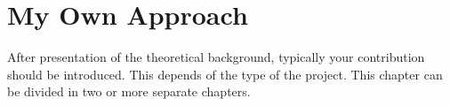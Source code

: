 \chapter{My Own Approach}
\beginchapter

After presentation of the theoretical background, typically  your
contribution should be introduced. This depends of the type of the
project. This chapter can be divided in two or more separate
chapters.


